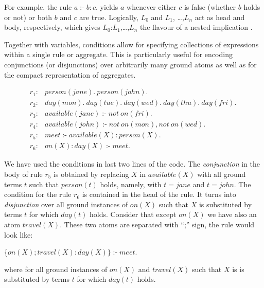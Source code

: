 \documentclass[a4paper, titlepage]{article}
\DeclareMathOperator{\leftimpl}{:-}
\begin{document}
For example, the rule $\mathit{a \leftimpl b : c.}$ yields 
$a$ whenever either $c$ is false (whether $b$ holds or not) 
or both $b$ and $c$ are true. Logically, $L_0$ and $L_1$,
\dots,$L_n$ act as head and body, respectively, which gives 
$L_0$:$L_1$,\dots,$L_n$ the flavour of a nested implication 
\cite{gkklorst2015}.

Together  with variables, conditions allow for specifying 
collections of expressions within a single rule or 
aggregate. This is particularly useful for encoding 
conjunctions (or disjunctions) over arbitrarily many ground 
atoms as well as for the compact representation of 
aggregates. 
\begin{exmp}
\begin{align*}
r_1\colon& \mathit{person}(\mathit{jane}). \  \mathit{person}
(\mathit{john}).\\
r_2\colon& \mathit{day}(\mathit{mon}). \ \mathit{day}
(\mathit{tue}). \ \mathit{day}(\mathit{wed}). \ \mathit{day}
(\mathit{thu}). \ \mathit{day}(\mathit{fri}). \ \\
r_3\colon& \mathit{available}(\mathit{jane}) \leftimpl not \  
\mathit{on}(\mathit{fri}).\\
r_4\colon& \mathit{available}(\mathit{john}) \leftimpl 
\mathit{not} \ \mathit{on}(\mathit{mon}), \mathit{not} \ 
\mathit{on}(\mathit{wed}).\\
r_5\colon& \mathit{meet} \leftimpl \mathit{available}(X) : 
\mathit{person}(X).\\
r_6\colon& \mathit{on}(X) : \mathit{day}(X) \leftimpl 
\mathit{meet}.
\end{align*}
\end{exmp}  
We have used the conditions in last two lines of the code. 
The \emph{conjunction} in the body of rule $r_5$ is obtained by 
replacing $X$ in $\mathit{available(X)}$ with all ground 
terms $t$ such that $\mathit{person(t)}$ holds, namely, 
with $\mathit{t=jane}$ and $\mathit{t=john}$. The condition 
for the rule $r_6$ is contained in the head of the rule. It 
turns into \emph{disjunction} over all ground instances of 
$\mathit{on(X)}$ such that $X$ is substituted by terms $t$ 
for which $\mathit{day(t)}$ holds. Consider that except $\mathit{on(X)}$ we have also an atom $\mathit{travel(X)}$. These two atoms are separated with ``;'' sign, the rule would look like:
\centerline{\{$\mathit{on}(X);\mathit{travel}(X) : \mathit{day}(X)\} \leftimpl 
\mathit{meet}.$}
where for all ground instances of $\mathit{on(X)}$ and $\mathit{travel(X)}$ such that $X$ is is substituted by terms $t$ for which $\mathit{day(t)}$ holds. 
\end{document}
